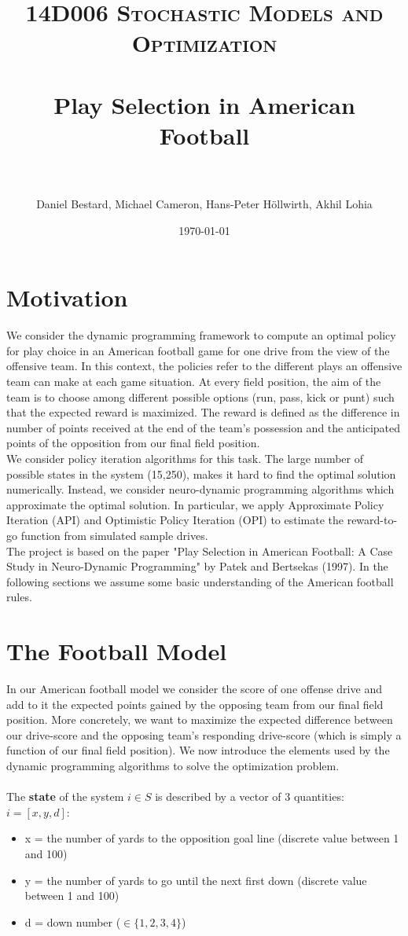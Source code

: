 \documentclass[11pt, oneside]{article}   	%
\title{
\normalfont \normalsize
\textsc{14D006 Stochastic Models and Optimization} \\ [25pt] %
\horrule{0.5pt} \\[0.4cm] %
\huge Play Selection in American Football\\ %
\horrule{2pt} \\[0.5cm] %
}
\author{Daniel Bestard, Michael Cameron, Hans-Peter H{\"o}llwirth, Akhil Lohia} %
\date{\normalsize\today} %
\begin{document}
\maketitle

\section{Motivation}
We consider the dynamic programming framework to compute an optimal policy for play choice in an American football game for one drive from the view of the offensive team. In this context, the policies refer to the different plays an offensive team can make at each game situation. At every field position, the aim of the team is to choose among different possible options (run, pass, kick or punt) such that the expected reward is maximized. The reward is defined as the difference in number of points received at the end of the team's possession and the anticipated points of the opposition from our final field position. \\

We consider policy iteration algorithms for this task. The large number of possible states in the system (15,250), makes it hard to find the optimal solution numerically. Instead, we consider neuro-dynamic programming algorithms which approximate the optimal solution. In particular, we apply Approximate Policy Iteration (API) and Optimistic Policy Iteration (OPI) to estimate the reward-to-go function from simulated sample drives.\\

The project is based on the paper "Play Selection in American Football: A Case Study in Neuro-Dynamic Programming" by Patek and Bertsekas (1997). In the following sections we assume some basic understanding of the American football rules. 


\section{The Football Model}
In our American football model we consider the score of one offense drive and add to it the expected points gained by the opposing team from our final field position. More concretely, we want to maximize the expected difference between our drive-score and the opposing team's responding drive-score (which is simply a function of our final field position). We now introduce the elements used by the dynamic programming algorithms to solve the optimization problem. \\\\
The \textbf{state} of the system $i \in S$ is described by a vector of 3 quantities: $i = [x,y,d]$:
\begin{itemize}
\item x = the number of yards to the opposition goal line (discrete value between 1 and 100)
\item y = the number of yards to go until the next first down (discrete value between 1 and 100)
\item d = down number ($\in \{1,2,3,4\}$)
\end{itemize}
\end{document}
